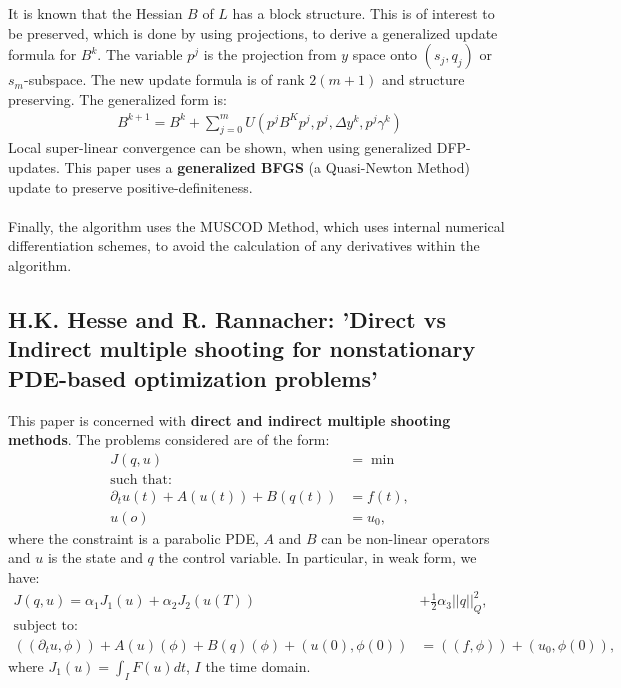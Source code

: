 \documentclass[11pt, a4paper]{article}
\theoremstyle{definition}
\begin{document}
\\
\\
It is known that the Hessian $B$ of $L$ has a block structure. This is of interest to be preserved, which is done by using projections, to derive a generalized update formula for $B^k$. The variable $p^j$ is the projection from $y$ space onto $(s_j,q_j)$ or $s_m$-subspace. The new update formula is of rank $2(m+1)$ and structure preserving. The generalized form is:
\begin{align*}
B^{k+1}=B^k + \sum_{j=0}^m U(p^jB^Kp^j, p^j,\Delta y^k,p^j\gamma^k)
\end{align*}
Local super-linear convergence can be shown, when using generalized DFP-updates. This paper uses a \textbf{generalized BFGS} (a Quasi-Newton Method) update to preserve positive-definiteness.
\\
\\
Finally, the algorithm uses the MUSCOD Method, which uses internal numerical differentiation schemes, to avoid the calculation of any derivatives within the algorithm.

\subsection{H.K. Hesse and R. Rannacher: 'Direct vs Indirect multiple shooting for nonstationary PDE-based optimization problems'}

This paper is concerned with \textbf{direct and indirect multiple shooting methods}. The problems considered are of the form:
\begin{align*}
J(q,u) &=\min \\
\text{such that:}&\\
\partial_t u(t)+ A(u(t)) + B(q(t)) &= f(t),\\
u(o)&=u_0,
\end{align*}
where the constraint is a parabolic PDE, $A$ and $B$ can be non-linear operators and $u$ is the state and $q$ the control variable.
In particular, in weak form, we have:
\begin{align*}
J(q,u) = \alpha_1 J_1(u) + \alpha_2 J_2(u(T)) &+ \frac{1}{2}\alpha_3 ||q||_Q^2,\\
\text{subject to:}&\\
((\partial_t u, \phi)) + A(u) (\phi ) + B(q)(\phi) + (u(0),\phi(0))& = ((f,\phi))+(u_0, \phi(0)),
\end{align*}
where $J_1(u) = \int_I F(u) dt$, $I$ the time domain.
\end{document}
